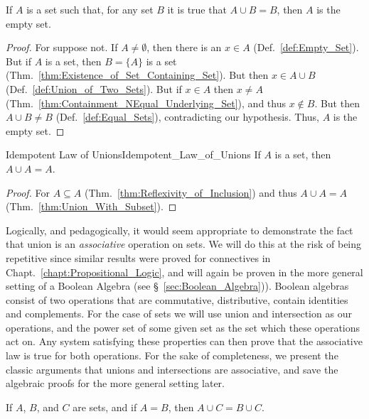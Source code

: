         \begin{theorem}
            \label{thm:Empty_Set_Is_Zero_for_Unions}%
            If $A$ is a set such that, for any set $B$ it is true that
            $A\cup{B}=B$, then $A$ is the empty set.
        \end{theorem}
        \begin{proof}
            For suppose not. If $A\ne\emptyset$, then there is an $x\in{A}$
            (Def.~\ref{def:Empty_Set}). But if $A$ is a set, then $B=\{A\}$ is a
            set (Thm.~\ref{thm:Existence_of_Set_Containing_Set}). But then
            $x\in{A}\cup{B}$ (Def.~\ref{def:Union_of_Two_Sets}). But if
            $x\in{A}$ then $x\ne{A}$
            (Thm.~\ref{thm:Containment_NEqual_Underlying_Set}), and thus
            $x\notin{B}$. But then $A\cup{B}\ne{B}$ (Def.~\ref{def:Equal_Sets}),
            contradicting our hypothesis. Thus, $A$ is the empty set.
        \end{proof}
        \begin{ltheorem}{Idempotent Law of Unions}{Idempotent_Law_of_Unions}
            If $A$ is a set, then $A\cup{A}=A$.
        \end{ltheorem}
        \begin{proof}
            For $A\subseteq{A}$ (Thm.~\ref{thm:Reflexivity_of_Inclusion}) and
            thus $A\cup{A}=A$ (Thm.~\ref{thm:Union_With_Subset}).
        \end{proof}
        Logically, and pedagogically, it would seem appropriate to demonstrate
        the fact that union is an \textit{associative} operation on sets. We
        will do this at the risk of being repetitive since similar results were
        proved for connectives in Chapt.~\ref{chapt:Propositional_Logic}, and
        will again be proven in the more general setting of a Boolean Algebra
        (see \S~\ref{sec:Boolean_Algebra})). Boolean algebras consist of two
        operations that are commutative, distributive, contain identities and
        complements. For the case of sets we will use union and intersection as
        our operations, and the power set of some given set as the set which
        these operations act on. Any system satisfying these properties can then
        prove that the associative law is true for both operations. For the sake
        of completeness, we present the classic arguments that unions and
        intersections are associative, and save the algebraic proofs for the
        more general setting later.
        \begin{theorem}
            \label{thm:Union_with_Equal_Sets}%
            If $A$, $B$, and $C$ are sets, and if $A=B$, then
            $A\cup{C}=B\cup{C}$.
        \end{theorem}
